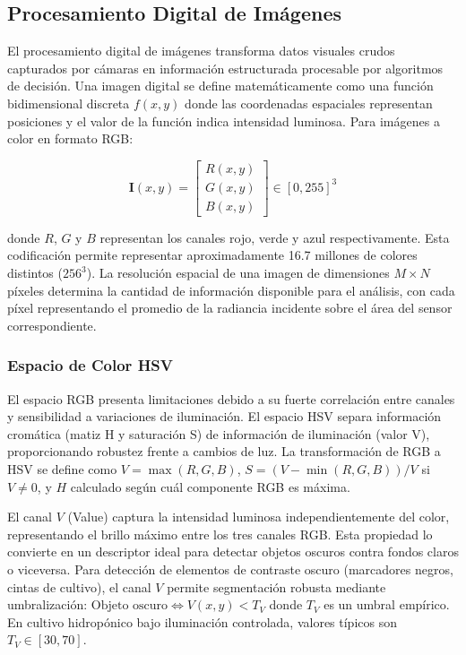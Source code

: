 \subsection{Procesamiento Digital de Imágenes}

El procesamiento digital de imágenes transforma datos visuales crudos capturados por cámaras en información estructurada procesable por algoritmos de decisión. Una imagen digital se define matemáticamente como una función bidimensional discreta $f(x,y)$ donde las coordenadas espaciales representan posiciones y el valor de la función indica intensidad luminosa. Para imágenes a color en formato RGB:

\begin{equation}
\mathbf{I}(x,y) = \begin{bmatrix} R(x,y) \\ G(x,y) \\ B(x,y) \end{bmatrix} \in [0, 255]^3
\end{equation}

donde $R$, $G$ y $B$ representan los canales rojo, verde y azul respectivamente. Esta codificación permite representar aproximadamente 16.7 millones de colores distintos ($256^3$). La resolución espacial de una imagen de dimensiones $M \times N$ píxeles determina la cantidad de información disponible para el análisis, con cada píxel representando el promedio de la radiancia incidente sobre el área del sensor correspondiente.

\subsubsection{Espacio de Color HSV}

El espacio RGB presenta limitaciones debido a su fuerte correlación entre canales y sensibilidad a variaciones de iluminación. El espacio HSV separa información cromática (matiz H y saturación S) de información de iluminación (valor V), proporcionando robustez frente a cambios de luz. La transformación de RGB a HSV se define como $V = \max(R, G, B)$, $S = (V - \min(R,G,B))/V$ si $V \neq 0$, y $H$ calculado según cuál componente RGB es máxima.

El canal $V$ (Value) captura la intensidad luminosa independientemente del color, representando el brillo máximo entre los tres canales RGB. Esta propiedad lo convierte en un descriptor ideal para detectar objetos oscuros contra fondos claros o viceversa. Para detección de elementos de contraste oscuro (marcadores negros, cintas de cultivo), el canal $V$ permite segmentación robusta mediante umbralización: $\text{Objeto oscuro} \Leftrightarrow V(x,y) < T_V$ donde $T_V$ es un umbral empírico. En cultivo hidropónico bajo iluminación controlada, valores típicos son $T_V \in [30, 70]$.

